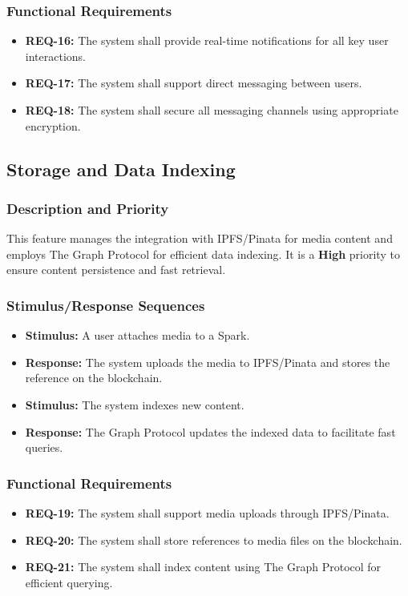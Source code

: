 \documentclass[a4paper,12pt]{article}
\begin{document}
\subsubsection{Functional Requirements}
\begin{itemize}
    \item \textbf{REQ-16:} The system shall provide real-time notifications for all key user interactions.
    \item \textbf{REQ-17:} The system shall support direct messaging between users.
    \item \textbf{REQ-18:} The system shall secure all messaging channels using appropriate encryption.
\end{itemize}

\subsection{Storage and Data Indexing}
\subsubsection{Description and Priority}
This feature manages the integration with IPFS/Pinata for media content and employs The Graph Protocol for efficient data indexing. It is a \textbf{High} priority to ensure content persistence and fast retrieval.

\subsubsection{Stimulus/Response Sequences}
\begin{itemize}
    \item \textbf{Stimulus:} A user attaches media to a Spark.
    \item \textbf{Response:} The system uploads the media to IPFS/Pinata and stores the reference on the blockchain.
    \item \textbf{Stimulus:} The system indexes new content.
    \item \textbf{Response:} The Graph Protocol updates the indexed data to facilitate fast queries.
\end{itemize}

\subsubsection{Functional Requirements}
\begin{itemize}
    \item \textbf{REQ-19:} The system shall support media uploads through IPFS/Pinata.
    \item \textbf{REQ-20:} The system shall store references to media files on the blockchain.
    \item \textbf{REQ-21:} The system shall index content using The Graph Protocol for efficient querying.
\end{itemize}
\end{document}
